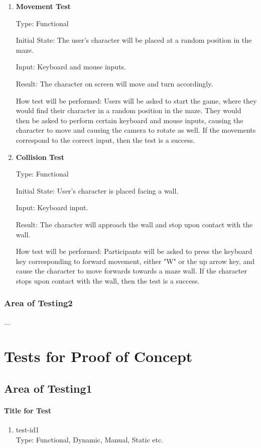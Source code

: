 \documentclass[12pt, titlepage]{article}
\begin{document}
\begin{enumerate}
\begin{enumerate}
\item{}
\textbf{Movement Test}

Type: Functional
					
Initial State: The user's character will be placed at a random position in the maze.
					
Input: Keyboard and mouse inputs.
					
Result: The character on screen will move and turn accordingly.
					
How test will be performed: Users will be asked to start the game, where they would find their character in a random position in the maze. They would then be asked to perform certain keyboard and mouse inputs, causing the character to move and causing the camera to rotate as well. If the movements correspond to the correct input, then the test is a success. 

\item{}
\textbf{Collision Test}

Type: Functional
					
Initial State: User's character is placed facing a wall.
					
Input: Keyboard input.
					
Result: The character will approach the wall and stop upon contact with the wall.  
					
How test will be performed: Participants will be asked to press the keyboard key corresponding to forward movement, either "W" or the up arrow key, and cause the character to move forwards towards a maze wall. If the character stops upon contact with the wall, then the test is a success. 
\end{enumerate}
\subsubsection{Area of Testing2}
...
\section{Tests for Proof of Concept}
\subsection{Area of Testing1}
		
\paragraph{Title for Test}
\begin{enumerate}
\item{test-id1\\}
Type: Functional, Dynamic, Manual, Static etc.
					

\end{enumerate}
\end{enumerate}
\end{document}
